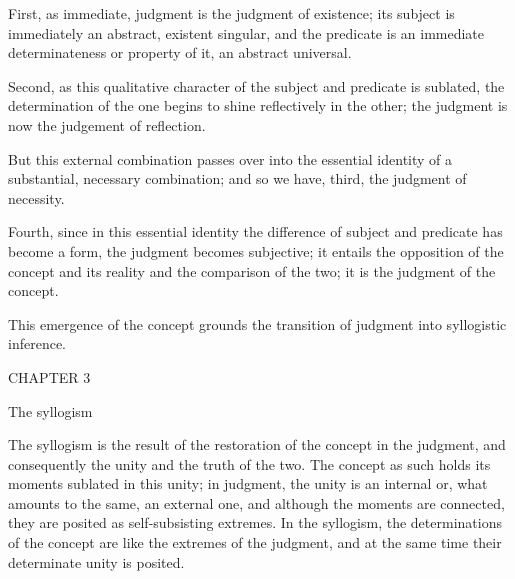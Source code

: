First, as immediate, judgment is the judgment of existence;
its subject is immediately an abstract, existent singular,
and the predicate is an immediate determinateness or property of it,
an abstract universal.

Second, as this qualitative character of
the subject and predicate is sublated,
the determination of the one begins
to shine reflectively in the other;
the judgment is now the judgement of reflection.

But this external combination passes over
into the essential identity of a substantial, necessary combination;
and so we have, third, the judgment of necessity.

Fourth, since in this essential identity
the difference of subject and predicate has become a form,
the judgment becomes subjective;
it entails the opposition of the concept and its reality
and the comparison of the two;
it is the judgment of the concept.

This emergence of the concept grounds
the transition of judgment into syllogistic inference.

CHAPTER 3

The syllogism

The syllogism is the result of
the restoration of the concept in the judgment,
and consequently the unity and the truth of the two.
The concept as such holds its moments
sublated in this unity;
in judgment, the unity is an internal
or, what amounts to the same, an external one,
and although the moments are connected,
they are posited as self-subsisting extremes.
In the syllogism, the determinations of the concept
are like the extremes of the judgment,
and at the same time their determinate unity is posited.

